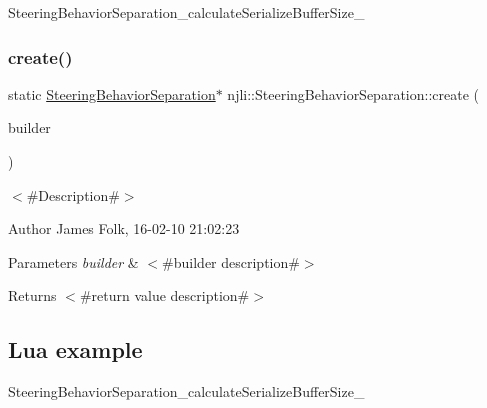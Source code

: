 \begin{DoxyCodeInclude}
\end{DoxyCodeInclude}
Steering\+Behavior\+Separation\+\_\+calculate\+Serialize\+Buffer\+Size\+\_\+ \mbox{\label{classnjli_1_1_steering_behavior_separation_aa6421180da4f429f8957cc69cc6e94b9}} 
\subsubsection{\texorpdfstring{create()}{create()}\hspace{0.1cm}{\footnotesize\ttfamily [2/2]}}
{\footnotesize\ttfamily static \mbox{\hyperlink{classnjli_1_1_steering_behavior_separation}{Steering\+Behavior\+Separation}}$\ast$ njli\+::\+Steering\+Behavior\+Separation\+::create (\begin{DoxyParamCaption}\item[{const \mbox{\hyperlink{classnjli_1_1_steering_behavior_separation_builder}{Steering\+Behavior\+Separation\+Builder}} \&}]{builder }\end{DoxyParamCaption})\hspace{0.3cm}{\ttfamily [static]}}



$<$\#\+Description\#$>$ 

\begin{DoxyAuthor}{Author}
James Folk, 16-\/02-\/10 21\+:02\+:23
\end{DoxyAuthor}

\begin{DoxyParams}{Parameters}
{\em builder} & $<$\#builder description\#$>$\\
\hline
\end{DoxyParams}
\begin{DoxyReturn}{Returns}
$<$\#return value description\#$>$
\end{DoxyReturn}
\hypertarget{classnjli_1_1_steering_behavior_wander_ex1}{}\subsection{Lua example}\label{classnjli_1_1_steering_behavior_wander_ex1}

\begin{DoxyCodeInclude}
\end{DoxyCodeInclude}
Steering\+Behavior\+Separation\+\_\+calculate\+Serialize\+Buffer\+Size\+\_\+ \mbox{\label{classnjli_1_1_steering_behavior_separation_a4385da20f00d15b89fcb288f7b4fc275}} 
